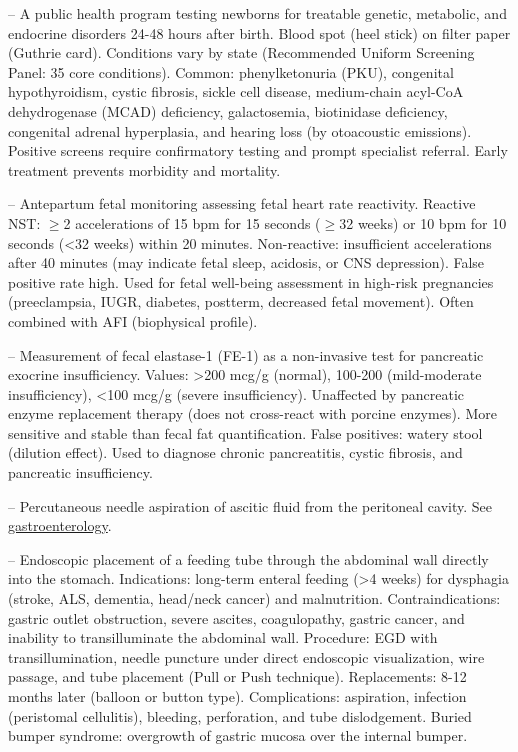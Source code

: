 -- A public health program testing newborns for treatable genetic, metabolic, and endocrine disorders 24-48 hours after birth. Blood spot (heel stick) on filter paper (Guthrie card). Conditions vary by state (Recommended Uniform Screening Panel: 35 core conditions). Common: phenylketonuria (PKU), congenital hypothyroidism, cystic fibrosis, sickle cell disease, medium-chain acyl-CoA dehydrogenase (MCAD) deficiency, galactosemia, biotinidase deficiency, congenital adrenal hyperplasia, and hearing loss (by otoacoustic emissions). Positive screens require confirmatory testing and prompt specialist referral. Early treatment prevents morbidity and mortality.

-- Antepartum fetal monitoring assessing fetal heart rate reactivity. Reactive NST: \(\ge\)2 accelerations of 15 bpm for 15 seconds (\(\ge\)32 weeks) or 10 bpm for 10 seconds (<32 weeks) within 20 minutes. Non-reactive: insufficient accelerations after 40 minutes (may indicate fetal sleep, acidosis, or CNS depression). False positive rate high. Used for fetal well-being assessment in high-risk pregnancies (preeclampsia, IUGR, diabetes, postterm, decreased fetal movement). Often combined with AFI (biophysical profile).

-- Measurement of fecal elastase-1 (FE-1) as a non-invasive test for pancreatic exocrine insufficiency. Values: >200 mcg/g (normal), 100-200 (mild-moderate insufficiency), <100 mcg/g (severe insufficiency). Unaffected by pancreatic enzyme replacement therapy (does not cross-react with porcine enzymes). More sensitive and stable than fecal fat quantification. False positives: watery stool (dilution effect). Used to diagnose chronic pancreatitis, cystic fibrosis, and pancreatic insufficiency.

-- Percutaneous needle aspiration of ascitic fluid from the peritoneal cavity. See \hyperlink{Gastroenterology}{gastroenterology}.

-- Endoscopic placement of a feeding tube through the abdominal wall directly into the stomach. Indications: long-term enteral feeding (>4 weeks) for dysphagia (stroke, ALS, dementia, head/neck cancer) and malnutrition. Contraindications: gastric outlet obstruction, severe ascites, coagulopathy, gastric cancer, and inability to transilluminate the abdominal wall. Procedure: EGD with transillumination, needle puncture under direct endoscopic visualization, wire passage, and tube placement (Pull or Push technique). Replacements: 8-12 months later (balloon or button type). Complications: aspiration, infection (peristomal cellulitis), bleeding, perforation, and tube dislodgement. Buried bumper syndrome: overgrowth of gastric mucosa over the internal bumper.

